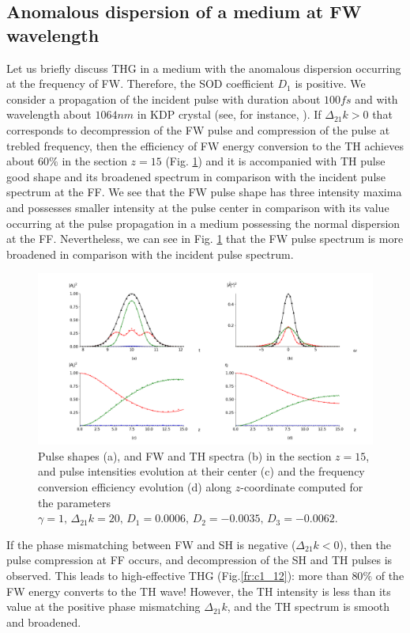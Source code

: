 \documentclass[a4paper, 12pt, onecolumn]{extarticle}
\begin{document}
\subsection{Anomalous dispersion of a medium at FW wavelength}
\label{par:an}
Let us briefly discuss THG in a medium with the anomalous dispersion occurring at the frequency of FW. Therefore, the SOD coefficient \(D_1\) is positive. We consider a propagation of the incident pulse with duration about \(100fs\) and with wavelength about \(1064nm\) in KDP crystal (see, for instance, \cite{bib:ri}). If \(\Delta_{21}k>0\) that corresponds to decompression of the FW pulse and compression of the pulse at trebled frequency, then the efficiency of FW energy conversion to the TH achieves about \(60\%\) in the section \(z=15\) (Fig. \ref{fr:c1_11}) and it is accompanied with TH pulse good shape and its broadened spectrum in comparison with the incident pulse spectrum at the FF. We see that the FW pulse shape has three intensity maxima and possesses smaller intensity at the pulse center in comparison with its value occurring at the pulse propagation in a medium possessing the normal dispersion at the FF. Nevertheless, we can see in Fig. \ref{fr:c1_11} that the FW pulse spectrum is more broadened in comparison with the incident pulse spectrum.

\begin{figure}[h!] 
\centering 
\includegraphics[width=0.9\linewidth]{Cascade1_11}  
\caption{Pulse shapes (a), and FW and TH spectra (b) in the section \(z=15\), and pulse intensities evolution at their center (c) and the frequency conversion efficiency evolution (d) along \(z\)-coordinate computed for the parameters  $\gamma=1,\, \Delta_{21} k=20,\, D_1=0.0006,\, D_2=-0.0035,\, D_3=-0.0062.$} 
\label{fr:c1_11}
\end{figure}

If the phase mismatching between FW and SH is negative (\(\Delta_{21}k<0\)), then the pulse compression at FF occurs, and decompression of the SH and TH pulses is observed. This leads to high-effective THG (Fig.\ref{fr:c1_12}): more than \(80\%\) of the FW energy converts to the TH wave! However, the TH intensity is less than its value at the positive phase mismatching \(\Delta_{21}k\), and the TH spectrum is smooth and broadened.
\end{document}

